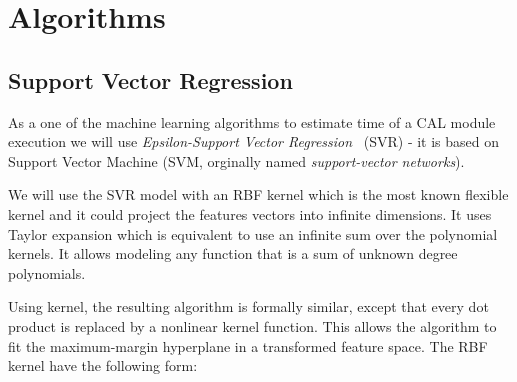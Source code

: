 \section{Algorithms}
\subsection{Support Vector Regression}

As a one of the machine learning algorithms to estimate time of a CAL module execution we will use \textit{Epsilon-Support Vector Regression}~\cite{svrc} (SVR) - it is based on Support Vector Machine (SVM, orginally named \textit{support-vector networks}\cite{svm}).

We will use the SVR model with an RBF kernel\cite{rbf_kernel} which is the most known flexible kernel and it could project the features vectors into infinite dimensions. It uses Taylor expansion which is equivalent to use an infinite sum over the polynomial kernels. It allows modeling any function that is a sum of unknown degree polynomials.

Using kernel, the resulting algorithm is formally similar, except that every dot product is replaced by a nonlinear kernel function. This allows the algorithm to fit the maximum-margin hyperplane in a transformed feature space. The RBF kernel have the following form:

